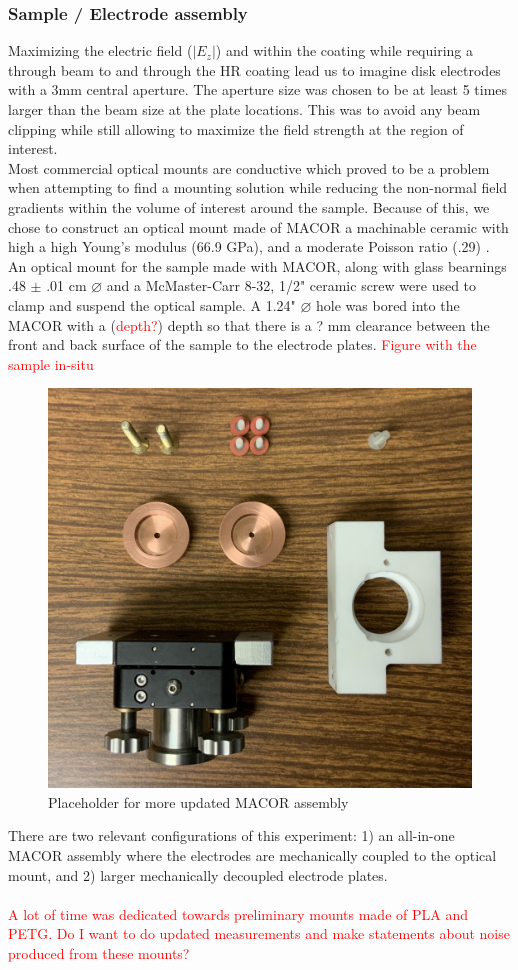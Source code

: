 \subsubsection{Sample / Electrode assembly}
Maximizing the electric field ($|E_z|$) and within the coating while requiring a through beam to and through the HR coating lead us to imagine disk electrodes with a 3mm central aperture. The aperture size was chosen to be at least 5 times larger than the beam size at the plate locations. This was to avoid any beam clipping while still allowing to maximize the field strength at the region of interest.
\\
Most commercial optical mounts are conductive which proved to be a problem when attempting to find a mounting solution while reducing the non-normal field gradients within the volume of interest around the sample. Because of this, we chose to construct an optical mount made of MACOR a machinable ceramic with high a high Young's modulus (66.9 GPa), and a moderate Poisson ratio (.29) \cite{macor}. An optical mount for the sample made with MACOR, along with glass bearnings .48 $\pm$ .01 cm $\diameter$  and a McMaster-Carr 8-32, 1/2" ceramic screw were used to clamp and suspend the optical sample. A 1.24" $\diameter$ hole was bored into the MACOR with a (\textcolor{red}{depth?}) depth so that there is a ? mm clearance between the front and back surface of the sample to the electrode plates.
\textcolor{red}{Figure with  the sample in-situ}
\\
\begin{figure}[H]
\centering
\includegraphics[width=.75\textwidth]{figs/ALGAAS/macor_assembly.jpeg}
\caption{Placeholder for more updated MACOR assembly}
\label{fig:Ez}
\end{figure}
There are two relevant configurations of this experiment: 1) an all-in-one MACOR assembly where the electrodes are mechanically coupled to the optical mount, and 2) larger mechanically decoupled electrode plates.
\\
\\
\textcolor{red}{A lot of time was dedicated towards preliminary mounts made of PLA and PETG. Do I want to do updated measurements and make statements about noise produced from these mounts?}
\\
\\


